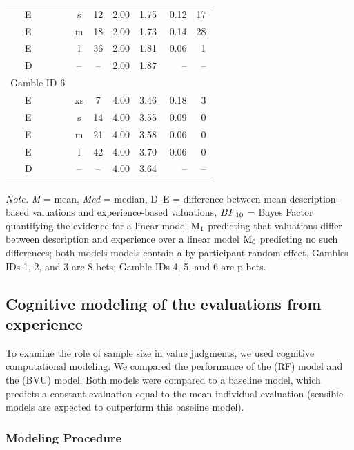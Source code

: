 \documentclass[a4paper, man, floatsintext]{apa6}
\begin{document}
\begin{table}[tbp]
\begin{center}
\begin{threeparttable}
\begin{tabular}{lccccrr}
\ \ \ E & s & 12 & 2.00 & 1.75 & 0.12 & 17\\
\ \ \ E & m & 18 & 2.00 & 1.73 & 0.14 & 28\\
\ \ \ E & l & 36 & 2.00 & 1.81 & 0.06 & 1\\
\ \ \ D & -- & -- & 2.00 & 1.87 & -- & --\\
Gamble ID 6 &  &  &  &  &  & \\
\ \ \ E & xs & 7 & 4.00 & 3.46 & 0.18 & 3\\
\ \ \ E & s & 14 & 4.00 & 3.55 & 0.09 & 0\\
\ \ \ E & m & 21 & 4.00 & 3.58 & 0.06 & 0\\
\ \ \ E & l & 42 & 4.00 & 3.70 & -0.06 & 0\\
\ \ \ D & -- & -- & 4.00 & 3.64 & -- & --\\
\bottomrule
\addlinespace
\end{tabular}
\begin{tablenotes}[para]
\normalsize{\textit{Note.} \textit{M} = mean, \textit{Med} = median, D--E = difference between mean description-based valuations and experience-based valuations, $BF\textsubscript{10}$ = Bayes Factor quantifying the evidence for a linear model $\mathrm{M}\textsubscript{1}$ predicting that valuations differ between description and experience over a linear model $\mathrm{M}\textsubscript{0}$ predicting no such differences; both models models contain a by-participant random effect. Gambles IDs 1, 2, and 3 are \$-bets; Gamble IDs 4, 5, and 6 are p-bets.}
\end{tablenotes}
\end{threeparttable}
\end{center}
\end{table}

\subsection{Cognitive modeling of the evaluations from experience}
To examine the role of sample size in value judgments, we
used cognitive computational modeling. We compared the performance of
the  (RF) model and the
 (BVU) model. Both models were compared to a baseline model, which predicts a constant evaluation equal to the mean individual evaluation (sensible models are expected to outperform this baseline model).

\subsubsection{Modeling Procedure}
\end{document}
